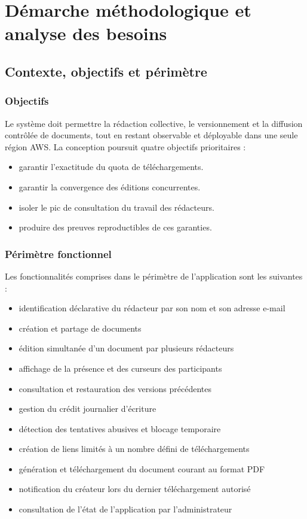 \chapter{Démarche méthodologique et analyse des besoins}

\section{Contexte, objectifs et périmètre}
\subsection{Objectifs}

Le système doit permettre la rédaction collective, le versionnement et la diffusion contrôlée de documents, tout en restant observable et déployable dans une seule région AWS. La conception poursuit quatre objectifs prioritaires :


\begin{itemize}
\item garantir l'exactitude du quota de téléchargements.
\item garantir la convergence des éditions concurrentes.
\item isoler le pic de consultation du travail des rédacteurs.
\item produire des preuves reproductibles de ces garanties.
\end{itemize}

\subsection{Périmètre fonctionnel}

Les fonctionnalités comprises dans le périmètre de l'application sont les suivantes :

\begin{itemize}
\item identification déclarative du rédacteur par son nom et son adresse e-mail
\item création et partage de documents
\item édition simultanée d'un document par plusieurs rédacteurs
\item affichage de la présence et des curseurs des participants
\item consultation et restauration des versions précédentes
\item gestion du crédit journalier d'écriture
\item détection des tentatives abusives et blocage temporaire
\item création de liens limités à un nombre défini de téléchargements
\item génération et téléchargement du document courant au format PDF
\item notification du créateur lors du dernier téléchargement autorisé
\item consultation de l'état de l'application par l'administrateur
\end{itemize}


